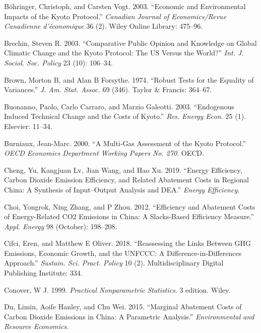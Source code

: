 \documentclass[12pt,]{article}
\begin{document}
\leavevmode\hypertarget{ref-Bohringer2003}{}%
Böhringer, Christoph, and Carsten Vogt. 2003. ``Economic and Environmental Impacts of the Kyoto Protocol.'' \emph{Canadian Journal of Economics/Revue Canadienne d'économique} 36 (2). Wiley Online Library: 475--96.

\leavevmode\hypertarget{ref-Brechin2003}{}%
Brechin, Steven R. 2003. ``Comparative Public Opinion and Knowledge on Global Climatic Change and the Kyoto Protocol: The US Versus the World?'' \emph{Int. J. Sociol. Soc. Policy} 23 (10): 106--34.

\leavevmode\hypertarget{ref-Brown1974}{}%
Brown, Morton B, and Alan B Forsythe. 1974. ``Robust Tests for the Equality of Variances.'' \emph{J. Am. Stat. Assoc.} 69 (346). Taylor \& Francis: 364--67.

\leavevmode\hypertarget{ref-Buonanno2003}{}%
Buonanno, Paolo, Carlo Carraro, and Marzio Galeotti. 2003. ``Endogenous Induced Technical Change and the Costs of Kyoto.'' \emph{Res. Energy Econ.} 25 (1). Elsevier: 11--34.

\leavevmode\hypertarget{ref-Burniaux2000}{}%
Burniaux, Jean-Marc. 2000. ``A Multi-Gas Assessment of the Kyoto Protocol.'' \emph{OECD Economics Department Working Papers No. 270}. OECD.

\leavevmode\hypertarget{ref-Cheng2019}{}%
Cheng, Yu, Kangjuan Lv, Jian Wang, and Hao Xu. 2019. ``Energy Efficiency, Carbon Dioxide Emission Efficiency, and Related Abatement Costs in Regional China: A Synthesis of Input--Output Analysis and DEA.'' \emph{Energy Efficiency}.

\leavevmode\hypertarget{ref-Choi2012}{}%
Choi, Yongrok, Ning Zhang, and P Zhou. 2012. ``Efficiency and Abatement Costs of Energy-Related CO2 Emissions in China: A Slacks-Based Efficiency Measure.'' \emph{Appl. Energy} 98 (October): 198--208.

\leavevmode\hypertarget{ref-Cifci2018}{}%
Cifci, Eren, and Matthew E Oliver. 2018. ``Reassessing the Links Between GHG Emissions, Economic Growth, and the UNFCCC: A Difference-in-Differences Approach.'' \emph{Sustain. Sci. Pract. Policy} 10 (2). Multidisciplinary Digital Publishing Institute: 334.

\leavevmode\hypertarget{ref-Conover1999}{}%
Conover, W J. 1999. \emph{Practical Nonparametric Statistics}. 3 edition. Wiley.

\leavevmode\hypertarget{ref-Du2015}{}%
Du, Limin, Aoife Hanley, and Chu Wei. 2015. ``Marginal Abatement Costs of Carbon Dioxide Emissions in China: A Parametric Analysis.'' \emph{Environmental and Resource Economics}.
\end{document}
